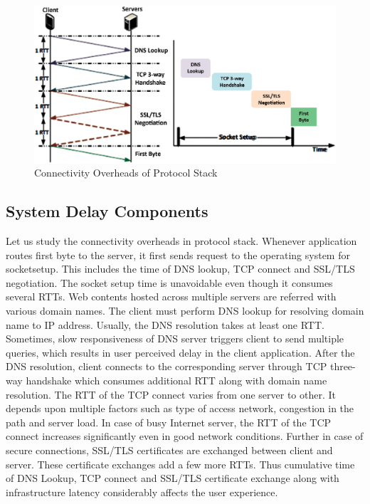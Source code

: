 \begin{multicols}{2}
\begin{figure}[H]
\centering
\includegraphics[scale=.9]{src/Figures/chap1/chap1-fig04.jpg}
\caption{Connectivity Overheads of Protocol Stack}\label{chap1-fig04}
\vspace{-0.5cm}
\end{figure}

\subsection{System Delay Components}

Let us study the connectivity overheads in protocol stack. Whenever application routes first byte to the server, it first sends request to the operating system for socketsetup. This includes the time of DNS lookup, TCP connect and SSL/TLS negotiation. The socket setup time is unavoidable even though it consumes several RTTs. Web contents hosted across multiple servers are referred with various domain names. The client must perform DNS lookup for resolving domain name to IP address. Usually, the DNS resolution takes at least one RTT. Sometimes, slow responsiveness of DNS server triggers client to send multiple queries, which results in user perceived delay in the client application. After the DNS resolution, client connects to the corresponding server through TCP three-way handshake which consumes additional RTT along with domain name resolution. The RTT of the TCP connect varies from one server to other. It depends upon multiple factors such as type of access network, congestion in the path and server load. In case of busy Internet server, the RTT of the TCP connect increases significantly even in good network conditions. Further in case of secure connections, SSL/TLS certificates are exchanged between client and server. These certificate exchanges add a few more RTTs. Thus cumulative time of DNS Lookup, TCP connect and SSL/TLS certificate exchange along with infrastructure latency considerably affects the user experience.


\end{multicols}
